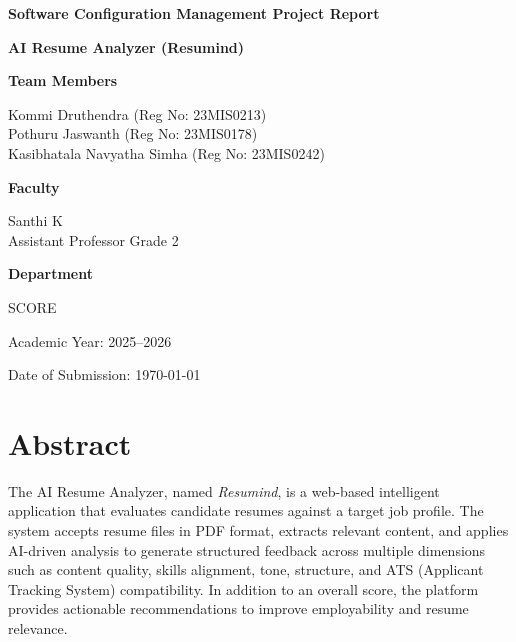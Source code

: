 \documentclass[12pt,a4paper]{report}
\begin{document}
\begin{titlepage}
    \centering
    \vspace*{1.2cm}

    {\LARGE \textbf{Software Configuration Management Project Report} \par}
    \vspace{1.2cm}

    {\Huge \textbf{AI Resume Analyzer (Resumind)} \par}
    \vspace{1.5cm}

    {\Large \textbf{Team Members} \par}
    \vspace{0.4cm}
    {\large
    Kommi Druthendra (Reg No: 23MIS0213) \\
    Pothuru Jaswanth (Reg No: 23MIS0178) \\
    Kasibhatala Navyatha Simha (Reg No: 23MIS0242)
    \par}

    \vspace{1.2cm}
    {\Large \textbf{Faculty} \par}
    \vspace{0.4cm}
    {\large
    Santhi K \\
    Assistant Professor Grade 2
    \par}

    \vspace{1.2cm}
    {\Large \textbf{Department} \par}
    \vspace{0.4cm}
    {\large SCORE \par}

    \vfill

    {\large Academic Year: 2025--2026 \par}
    \vspace{0.5cm}
    {\large Date of Submission: \today \par}
\end{titlepage}

\tableofcontents
\clearpage


\chapter{Abstract}
The AI Resume Analyzer, named \textit{Resumind}, is a web-based intelligent application that evaluates candidate resumes against a target job profile. The system accepts resume files in PDF format, extracts relevant content, and applies AI-driven analysis to generate structured feedback across multiple dimensions such as content quality, skills alignment, tone, structure, and ATS (Applicant Tracking System) compatibility. In addition to an overall score, the platform provides actionable recommendations to improve employability and resume relevance.
\end{document}
